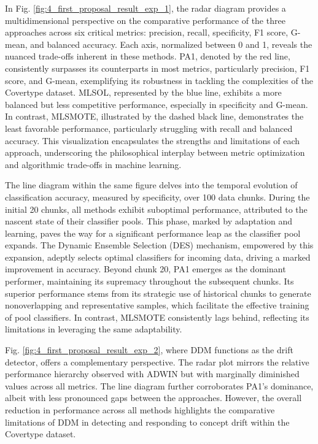 In Fig. \ref{fig:4_first_proposal_result_exp_1}, the radar diagram provides a multidimensional perspective on the comparative performance of the three approaches across six critical metrics: precision, recall, specificity, F1 score, G-mean, and balanced accuracy. Each axis, normalized between 0 and 1, reveals the nuanced trade-offs inherent in these methods. PA1, denoted by the red line, consistently surpasses its counterparts in most metrics, particularly precision, F1 score, and G-mean, exemplifying its robustness in tackling the complexities of the Covertype dataset. MLSOL, represented by the blue line, exhibits a more balanced but less competitive performance, especially in specificity and G-mean. In contrast, MLSMOTE, illustrated by the dashed black line, demonstrates the least favorable performance, particularly struggling with recall and balanced accuracy. This visualization encapsulates the strengths and limitations of each approach, underscoring the philosophical interplay between metric optimization and algorithmic trade-offs in machine learning.

The line diagram within the same figure delves into the temporal evolution of classification accuracy, measured by specificity, over 100 data chunks. During the initial 20 chunks, all methods exhibit suboptimal performance, attributed to the nascent state of their classifier pools. This phase, marked by adaptation and learning, paves the way for a significant performance leap as the classifier pool expands. The Dynamic Ensemble Selection (DES) mechanism, empowered by this expansion, adeptly selects optimal classifiers for incoming data, driving a marked improvement in accuracy. Beyond chunk 20, PA1 emerges as the dominant performer, maintaining its supremacy throughout the subsequent chunks. Its superior performance stems from its strategic use of historical chunks to generate nonoverlapping and representative samples, which facilitate the effective training of pool classifiers. In contrast, MLSMOTE consistently lags behind, reflecting its limitations in leveraging the same adaptability.

Fig. \ref{fig:4_first_proposal_result_exp_2}, where DDM functions as the drift detector, offers a complementary perspective. The radar plot mirrors the relative performance hierarchy observed with ADWIN but with marginally diminished values across all metrics. The line diagram further corroborates PA1’s dominance, albeit with less pronounced gaps between the approaches. However, the overall reduction in performance across all methods highlights the comparative limitations of DDM in detecting and responding to concept drift within the Covertype dataset.

